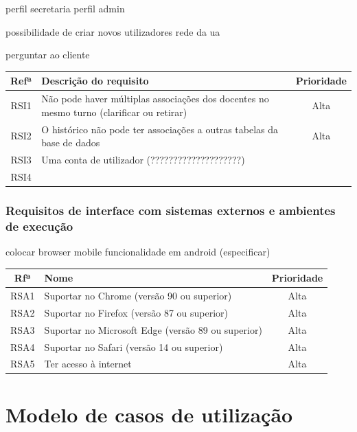 \documentclass[11pt, twoside]{report}
\begin{document}
	perfil secretaria 
	perfil admin
	
	possibilidade de criar novos utilizadores
	rede da ua
	
	perguntar ao cliente
	\begin{center}	
	\begin{tabularx}{\textwidth}{|c|X|c|}
		\hline
		\textbf{Refª }	& \textbf{Descrição do requisito} & \textbf{Prioridade} \\
		\hline
		RSI1 &Não pode haver múltiplas associações dos docentes no mesmo turno (clarificar ou retirar)&Alta\\
		\hline
		RSI2 &O histórico não pode ter associações a outras tabelas da base de dados  &Alta\\
		\hline
		RSI3 & Uma conta de utilizador (????????????????????)&\\
		\hline
		RSI4 & &\\
		\hline
	\end{tabularx}
	\label{requisitosdeseguranca}
\end{center}
	
	\subsection{Requisitos de interface com sistemas externos e ambientes de execução}
	
	colocar browser mobile
	funcionalidade em android (especificar)
	
		\begin{center}
		\begin{tabularx}{\textwidth}{|c|X|c|}
			\hline
			Rfª & Nome & Prioridade\\
			\hline
			RSA1 & Suportar no Chrome (versão 90 ou superior) &Alta\\
			\hline
			RSA2 &Suportar no Firefox (versão 87 ou superior) &Alta\\
			\hline
			RSA3 &Suportar no Microsoft Edge (versão 89 ou superior)&Alta\\
			\hline
			RSA4 &Suportar no Safari (versão 14 ou superior)&Alta\\
			\hline
			RSA5 &Ter acesso à internet&Alta\\
			\hline
		\end{tabularx}
		\label{requisitosdesistemas}
	\end{center}
	
	\chapter{Modelo de casos de utilização}
\end{document}
